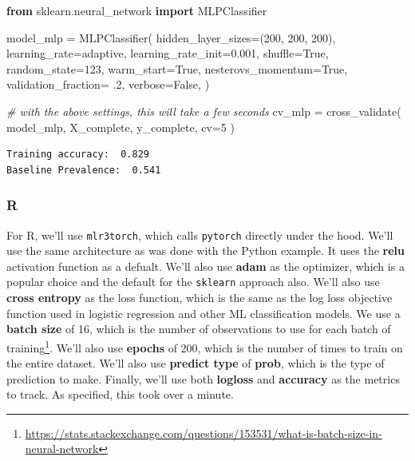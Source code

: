 \documentclass[
  letterpaper,
]{krantz}
\newenvironment{Shaded}{}{}
\newcommand{\CommentTok}[1]{\textcolor[rgb]{0.38,0.63,0.69}{\textit{#1}}}
\newcommand{\DecValTok}[1]{\textcolor[rgb]{0.25,0.63,0.44}{#1}}
\newcommand{\FloatTok}[1]{\textcolor[rgb]{0.25,0.63,0.44}{#1}}
\newcommand{\ImportTok}[1]{\textcolor[rgb]{0.00,0.50,0.00}{\textbf{#1}}}
\newcommand{\NormalTok}[1]{#1}
\newcommand{\OperatorTok}[1]{\textcolor[rgb]{0.40,0.40,0.40}{#1}}
\newcommand{\StringTok}[1]{\textcolor[rgb]{0.25,0.44,0.63}{#1}}
\newcommand{\VariableTok}[1]{\textcolor[rgb]{0.10,0.09,0.49}{#1}}
\DeclareRobustCommand{\href}[2]{#2\footnote{\url{#1}}}
\begin{document}
\begin{Shaded}
\begin{Highlighting}[]
\ImportTok{from}\NormalTok{ sklearn.neural\_network }\ImportTok{import}\NormalTok{ MLPClassifier}

\NormalTok{model\_mlp }\OperatorTok{=}\NormalTok{ MLPClassifier(}
\NormalTok{    hidden\_layer\_sizes}\OperatorTok{=}\NormalTok{(}\DecValTok{200}\NormalTok{, }\DecValTok{200}\NormalTok{, }\DecValTok{200}\NormalTok{),  }
\NormalTok{    learning\_rate}\OperatorTok{=}\StringTok{\textquotesingle{}adaptive\textquotesingle{}}\NormalTok{,}
\NormalTok{    learning\_rate\_init}\OperatorTok{=}\FloatTok{0.001}\NormalTok{,}
\NormalTok{    shuffle}\OperatorTok{=}\VariableTok{True}\NormalTok{,}
\NormalTok{    random\_state}\OperatorTok{=}\DecValTok{123}\NormalTok{,}
\NormalTok{    warm\_start}\OperatorTok{=}\VariableTok{True}\NormalTok{,}
\NormalTok{    nesterovs\_momentum}\OperatorTok{=}\VariableTok{True}\NormalTok{,}
\NormalTok{    validation\_fraction}\OperatorTok{=} \FloatTok{.2}\NormalTok{,}
\NormalTok{    verbose}\OperatorTok{=}\VariableTok{False}\NormalTok{,}
\NormalTok{)}

\CommentTok{\# with the above settings, this will take a few seconds}
\NormalTok{cv\_mlp }\OperatorTok{=}\NormalTok{ cross\_validate(}
\NormalTok{  model\_mlp, }
\NormalTok{  X\_complete, }
\NormalTok{  y\_complete, }
\NormalTok{  cv}\OperatorTok{=}\DecValTok{5}
\NormalTok{) }
\end{Highlighting}
\end{Shaded}

\begin{verbatim}
Training accuracy:  0.829 
Baseline Prevalence:  0.541
\end{verbatim}

\subsubsection{R}

For R, we'll use \texttt{mlr3torch}, which calls \texttt{pytorch}
directly under the hood. We'll use the same architecture as was done
with the Python example. It uses the \textbf{relu} activation function
as a defualt. We'll also use \textbf{adam} as the optimizer, which is a
popular choice and the default for the \texttt{sklearn} approach also.
We'll also use \textbf{cross entropy} as the loss function, which is the
same as the log loss objective function used in logistic regression and
other ML classification models. We use a \textbf{batch size} of 16,
which is the number of observations to use for each
\href{https://stats.stackexchange.com/questions/153531/what-is-batch-size-in-neural-network}{batch
of training}. We'll also use \textbf{epochs} of 200, which is the number
of times to train on the entire dataset. We'll also use \textbf{predict
type} of \textbf{prob}, which is the type of prediction to make.
Finally, we'll use both \textbf{logloss} and \textbf{accuracy} as the
metrics to track. As specified, this took over a minute.
\end{document}
